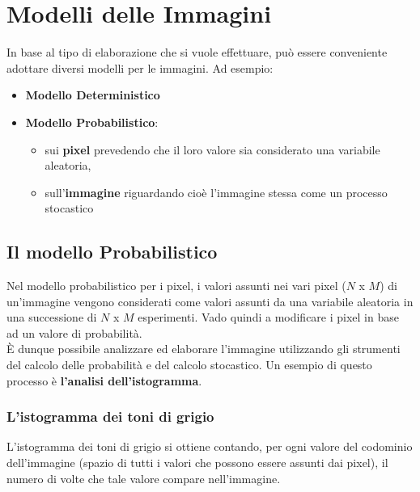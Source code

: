 \section{Modelli delle Immagini}

In base al tipo di elaborazione che si vuole effettuare, può essere conveniente
adottare diversi modelli per le immagini. Ad esempio:

\begin{itemize}
    \item \textbf{Modello Deterministico}
    \item \textbf{Modello Probabilistico}:
          \begin{itemize}
              \item sui \textbf{pixel} prevedendo che il loro valore sia
                    considerato una variabile aleatoria,
              \item sull'\textbf{immagine} riguardando cioè l'immagine stessa
                    come un processo stocastico

          \end{itemize}
\end{itemize}

\subsection{Il modello Probabilistico}

Nel modello probabilistico per i pixel, i valori assunti nei vari pixel ($N$ x
$M$) di un'immagine vengono considerati come valori assunti da una variabile
aleatoria in una successione di $N$ x $M$ esperimenti. Vado quindi a modificare i
pixel in base ad un valore di probabilità. \\È dunque possibile analizzare ed
elaborare l'immagine utilizzando gli strumenti del calcolo delle probabilità e
del calcolo stocastico. Un esempio di questo processo è \textbf{l'analisi
    dell'istogramma}.

\subsubsection{L'istogramma dei toni di grigio}

\begin{definition}
    L'istogramma dei toni di grigio si ottiene contando, per ogni valore del
    codominio dell'immagine (spazio di tutti i valori che possono essere assunti
    dai pixel), il numero di volte che tale valore compare nell'immagine.
\end{definition}


